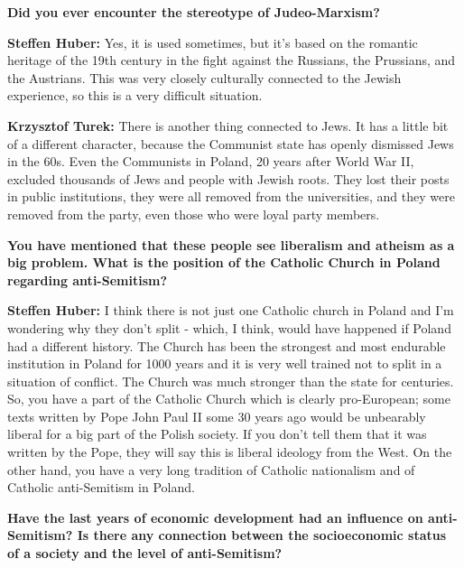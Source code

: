 \textbf{Did you ever encounter the stereotype of Judeo-Marxism?} 

\textbf{Steffen Huber:} Yes, it is used sometimes, but it's based on the romantic heritage of the 19th century in the fight against the Russians, the Prussians, and the Austrians. This was very closely culturally connected to the Jewish experience, so this is a very difficult situation.\par
\textbf{Krzysztof Turek:} There is another thing connected to Jews. It has a little bit of a different character, because the Communist state has openly dismissed Jews in the 60s. Even the Communists in Poland, 20 years after World War II, excluded thousands of Jews and people with Jewish roots. They lost their posts in public institutions, they were all removed from the universities, and they were removed from the party, even those who were loyal party members. 

\textbf{You have mentioned that these people see liberalism and atheism as a big problem. What is the position of the Catholic Church in Poland regarding anti-Semitism?} 

\textbf{Steffen Huber:} I think there is not just one Catholic church in Poland and I'm wondering why they don't split - which, I think, would have happened if Poland had a different history. The Church has been the strongest and most endurable institution in Poland for 1000 years and it is very well trained not to split in a situation of conflict. The Church was much stronger than the state for centuries. So, you have a part of the Catholic Church which is clearly pro-European; some texts written by Pope John Paul II some 30 years ago would be unbearably liberal for a big part of the Polish society. If you don't tell them that it was written by the Pope, they will say this is liberal ideology from the West. On the other hand, you have a very long tradition of Catholic nationalism and of Catholic anti-Semitism in Poland. 

\textbf{Have the last years of economic development had an influence on anti-Semitism? Is there any connection between the socioeconomic status of a society and the level of anti-Semitism?} 

